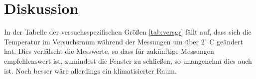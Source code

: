\documentclass[12pt,a4paper,titlepage,headinclude,bibtotoc]{scrartcl}
\begin{document}
\section{Diskussion}
\label{sec:diskussion}
In der Tabelle der versuchsspezifischen Größen \ref{tab:versgr} fällt auf, dass sich die Temperatur im Versuchsraum während der Messungen um über $2^\circ$ C geändert hat.
Dies verfälscht die Messwerte, so dass für zukünftige Messungen empfehlenswert ist, zumindest die Fenster zu schließen, so unangenehm dies auch ist.
Noch besser wäre allerdings ein klimatisierter Raum.




\end{document}
